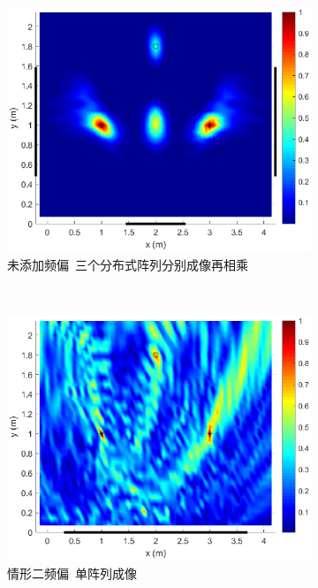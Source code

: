 \begin{figure}[H]
  \begin{subfigure}[t]{.3\linewidth}
    \centering
    \includegraphics[width=1\textwidth]{figures/distribution/expected/multiplication.eps}
    \caption{未添加频偏~三个分布式阵列分别成像再相乘}
  \end{subfigure}
  \\
  \begin{subfigure}[t]{.3\linewidth}
    \centering
    \includegraphics[width=1\textwidth]{figures/distribution/freq/array.eps}
    \caption{情形二频偏~单阵列成像}
  \end{subfigure}
  \begin{subfigure}[t]{.3\linewidth}

\end{subfigure}
\end{figure}
